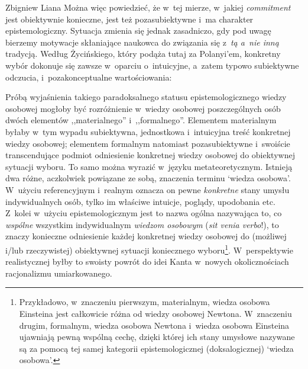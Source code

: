 \begin{artplenv}{Zbigniew Liana}
Można więc powiedzieć, że w~tej mierze, w~jakiej \textit{commitment} jest obiektywnie konieczne, jest też pozasubiektywne i~ma charakter epistemologiczny. Sytuacja zmienia się jednak zasadniczo, gdy pod uwagę bierzemy motywacje skłaniające naukowca do związania się z~\textit{tą a~nie inną} tradycją. Według Życińskiego, który podąża tutaj za Polanyi'em, konkretny wybór dokonuje się zawsze w~oparciu o~intuicyjne, a~zatem typowo subiektywne odczucia, i~pozakonceptualne wartościowania:


Próbą wyjaśnienia takiego paradoksalnego statusu epistemologicznego wiedzy osobowej mogłoby być rozróżnienie w~wiedzy osobowej poszczególnych osób dwóch elementów ,,materialnego'' i~,,formalnego''. Elementem materialnym byłaby w~tym wypadu subiektywna, jednostkowa i~intuicyjna treść konkretnej wiedzy osobowej; elementem formalnym natomiast pozasubiektywne i~swoiście transcendujące podmiot odniesienie konkretnej wiedzy osobowej do obiektywnej sytuacji wyboru. To samo można wyrazić w~języku metateoretycznym. Istnieją dwa różne, aczkolwiek powiązane ze sobą, znaczenia terminu ‘wiedza osobowa'. W~użyciu referencyjnym i~realnym oznacza on pewne \textit{konkretne} stany umysłu indywidualnych osób, tylko im właściwe intuicje, poglądy, upodobania etc. Z~kolei w~użyciu epistemologicznym jest to nazwa ogólna nazywająca to, co \textit{wspólne} wszystkim indywidualnym \textit{wiedzom osobowym} (\textit{sit venia verbo}!), to znaczy konieczne odniesienie każdej konkretnej wiedzy osobowej do (możliwej i/lub rzeczywistej) obiektywnej sytuacji koniecznego wyboru\footnote{Przykładowo, w~znaczeniu pierwszym, materialnym, wiedza osobowa Einsteina jest całkowicie różna od wiedzy osobowej Newtona. W~znaczeniu drugim, formalnym, wiedza osobowa Newtona i~wiedza osobowa Einsteina ujawniają pewną wspólną cechę, dzięki której ich stany umysłowe nazywane są za pomocą tej samej kategorii epistemologicznej (doksalogicznej) ‘wiedza osobowa'.}. W~perspektywie realistycznej byłby to swoisty powrót do idei Kanta w~nowych okolicznościach racjonalizmu umiarkowanego.


\end{artplenv}
